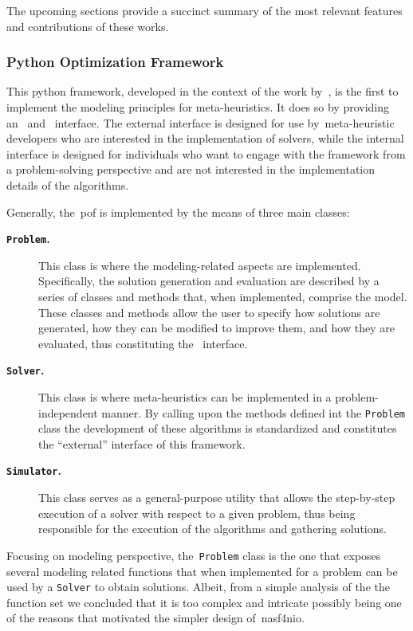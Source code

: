 The upcoming sections provide a succinct summary of the most relevant features
and contributions of these works.

\subsubsection*{Python Optimization Framework}

This python framework, developed in the context of the work
by~\citet{vieira2009uma}, is the first to implement the modeling principles for
meta-heuristics. It does so by providing an~
and~ interface. The external interface is designed for use
by~\acrshort{meta-heuristic} developers who are interested in the implementation
of solvers, while the internal interface is designed for individuals who want to
engage with the framework from a problem-solving perspective and are not
interested in the implementation details of the algorithms.

Generally, the~\acrshort{pof} is implemented by the means of three main classes:

\begin{description}
  \item[\textbf{\texttt{Problem}.}] This class is where the modeling-related
    aspects are implemented. Specifically, the solution generation and
    evaluation are described by a series of classes and methods that, when
    implemented, comprise the model. These classes and methods allow the user
    to specify how solutions are generated, how they can be modified to improve
    them, and how they are evaluated, thus constituting the~ interface.
  \item[\textbf{\texttt{Solver}.}] This class is where meta-heuristics can be implemented in
    a problem-independent manner. By calling upon the methods defined int the \texttt{Problem}
    class the development of these algorithms is standardized and constitutes the ``external''
    interface of this framework.
  \item[\textbf{\texttt{Simulator}.}] This class serves as a
    general-purpose utility that allows the step-by-step execution of a solver
    with respect to a given problem, thus being responsible for the execution
    of the algorithms and gathering solutions.
\end{description}

Focusing on modeling perspective, the~\texttt{Problem} class is the one that
exposes several modeling related functions that when implemented for a problem
can be used by a \texttt{Solver} to obtain solutions. Albeit, from a simple
analysis of the the function set we concluded that it is too complex and
intricate possibly being one of the reasons that motivated the simpler design
of~\acrshort{nasf4nio}.

